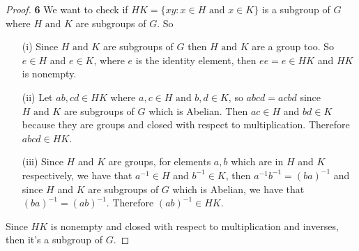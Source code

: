 \documentclass[11pt]{article}
\begin{document}
	\begin{proof}{\textbf{6}}
		We want to check if $HK = \{xy : x \in H \text{ and }x \in K\}$ is a subgroup of $G$ where $H \text{ and } K$ are subgroups of $G$. So
		\begin{itemize}
			\item[(i)] Since $H \text{ and } K$ are subgroups of $G$ then $H \text{ and } K$ are a group too. So $e \in H$ and $e \in K$, where $e$ is the identity element, then $ee=e \in HK$ and $HK$ is nonempty.
			\item[(ii)] Let $ab, cd \in HK$ where $a,c \in H \text{ and } b,d \in K$, so $abcd=acbd$ since $H \text{ and } K$ are subgroups of $G$ which is Abelian. Then $ac \in H$ and $bd \in K$ because they are groups and closed with respect to multiplication. Therefore $abcd \in HK$.
			\item[(iii)] Since $H$ and $K$ are groups, for elements $a,b$ which are in $H$ and $K$ respectively, we have that $a^{-1} \in H$ and $b^{-1} \in K$, then $a^{-1}b^{-1}=(ba)^{-1}$ and since $H$ and $K$ are subgroups of $G$ which is Abelian, we have that $(ba)^{-1}=(ab)^{-1}$. Therefore $(ab)^{-1} \in HK$.
		\end{itemize}
		Since $HK$ is nonempty and closed with respect to multiplication and inverses, then it's a subgroup of $G$.
	\end{proof}
\cleardoublepage
\end{document}
